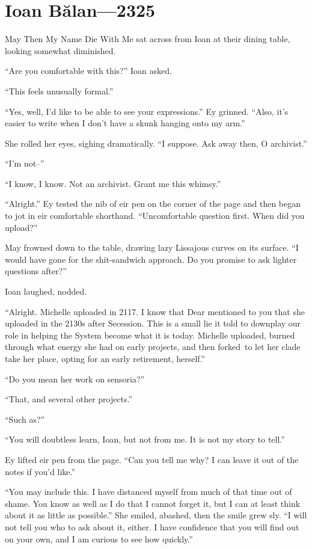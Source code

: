\hypertarget{ioan-bux103lan-2325}{%
\chapter{Ioan Bălan—2325}\label{ioan-bux103lan-2325}}

May Then My Name Die With Me sat across from Ioan at their dining table, looking somewhat diminished.

``Are you comfortable with this?'' Ioan asked.

``This feels unusually formal.''

``Yes, well, I'd like to be able to see your expressions.'' Ey grinned. ``Also, it's easier to write when I don't have a skunk hanging onto my arm.''

She rolled her eyes, sighing dramatically. ``I suppose. Ask away then, O archivist.''

``I'm not--''

``I know, I know. Not an archivist. Grant me this whimsy.''

``Alright.'' Ey tested the nib of eir pen on the corner of the page and then began to jot in eir comfortable shorthand. ``Uncomfortable question first. When did you upload?''

May frowned down to the table, drawing lazy Lissajous curves on its surface. ``I would have gone for the shit-sandwich approach. Do you promise to ask lighter questions after?''

Ioan laughed, nodded.

``Alright. Michelle uploaded in 2117. I know that Dear mentioned to you that she uploaded in the 2130s after Secession. This is a small lie it told to downplay our role in helping the System become what it is today. Michelle uploaded, burned through what energy she had on early projects, and then forked\pagebreak\ to let her clade take her place, opting for an early retirement, herself.''

``Do you mean her work on sensoria?''

``That, and several other projects.''

``Such as?''

``You will doubtless learn, Ioan, but not from me. It is not my story to tell.''

Ey lifted eir pen from the page. ``Can you tell me why? I can leave it out of the notes if you'd like.''

``You may include this. I have distanced myself from much of that time out of shame. You know as well as I do that I cannot forget it, but I can at least think about it as little as possible.'' She smiled, abashed, then the smile grew sly. ``I will not tell you who to ask about it, either. I have confidence that you will find out on your own, and I am curious to see how quickly.''

